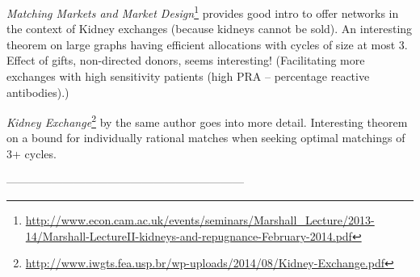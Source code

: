 \documentclass[
11pt, %
a4paper, %
oneside, %
headinclude,footinclude, %
BCOR5mm, %
]{scrartcl}
\begin{document}
\textit{Matching Markets and Market Design}\footnote{\url{http://www.econ.cam.ac.uk/events/seminars/Marshall_Lecture/2013-14/Marshall-LectureII-kidneys-and-repugnance-February-2014.pdf}} provides good intro to offer networks in the context of Kidney exchanges (because kidneys cannot be sold). An interesting theorem on large graphs having efficient allocations with cycles of size at most 3. Effect of gifts, non-directed donors, seems interesting! (Facilitating more exchanges with high sensitivity patients (high PRA -- percentage reactive antibodies).)

\textit{Kidney Exchange}\footnote{\url{http://www.iwgts.fea.usp.br/wp-uploads/2014/08/Kidney-Exchange.pdf}} by the same author goes into more detail. Interesting theorem on a bound for individually rational matches when seeking optimal matchings of 3+ cycles.

---------------------------------------------------------------

\renewcommand{\refname}{\spacedlowsmallcaps{References}} %




\end{document}

